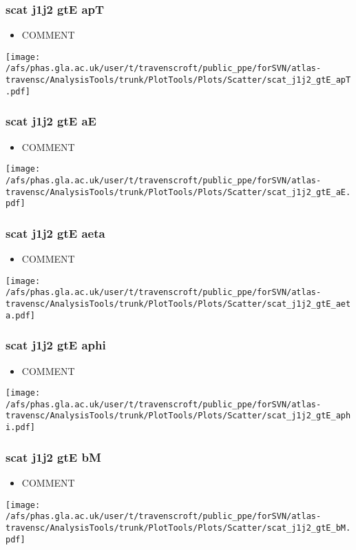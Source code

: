 \documentclass{beamer}
\begin{document}
\begin{frame}
\frametitle{scat j1j2 gtE apT}
\begin{itemize}
\item COMMENT
\end{itemize}
\begin{center}
\texttt{[image: /afs/phas.gla.ac.uk/user/t/travenscroft/public\_ppe/forSVN/atlas-travensc/AnalysisTools/trunk/PlotTools/Plots/Scatter/scat\_j1j2\_gtE\_apT.pdf]}
\end{center}
\end{frame}

\begin{frame}
\frametitle{scat j1j2 gtE aE}
\begin{itemize}
\item COMMENT
\end{itemize}
\begin{center}
\texttt{[image: /afs/phas.gla.ac.uk/user/t/travenscroft/public\_ppe/forSVN/atlas-travensc/AnalysisTools/trunk/PlotTools/Plots/Scatter/scat\_j1j2\_gtE\_aE.pdf]}
\end{center}
\end{frame}

\begin{frame}
\frametitle{scat j1j2 gtE aeta}
\begin{itemize}
\item COMMENT
\end{itemize}
\begin{center}
\texttt{[image: /afs/phas.gla.ac.uk/user/t/travenscroft/public\_ppe/forSVN/atlas-travensc/AnalysisTools/trunk/PlotTools/Plots/Scatter/scat\_j1j2\_gtE\_aeta.pdf]}
\end{center}
\end{frame}

\begin{frame}
\frametitle{scat j1j2 gtE aphi}
\begin{itemize}
\item COMMENT
\end{itemize}
\begin{center}
\texttt{[image: /afs/phas.gla.ac.uk/user/t/travenscroft/public\_ppe/forSVN/atlas-travensc/AnalysisTools/trunk/PlotTools/Plots/Scatter/scat\_j1j2\_gtE\_aphi.pdf]}
\end{center}
\end{frame}

\begin{frame}
\frametitle{scat j1j2 gtE bM}
\begin{itemize}
\item COMMENT
\end{itemize}
\begin{center}
\texttt{[image: /afs/phas.gla.ac.uk/user/t/travenscroft/public\_ppe/forSVN/atlas-travensc/AnalysisTools/trunk/PlotTools/Plots/Scatter/scat\_j1j2\_gtE\_bM.pdf]}
\end{center}
\end{frame}
\end{document}
